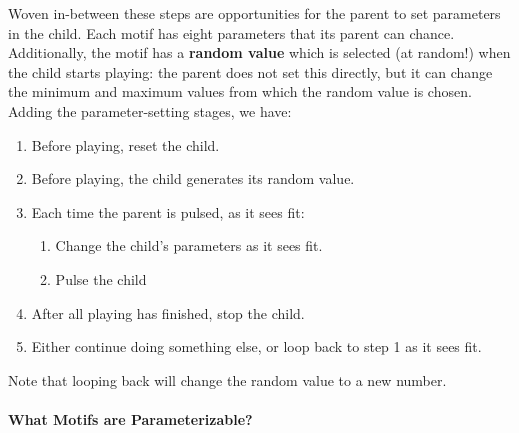 \documentclass[twoside,10pt]{article}
\begin{document}
Woven in-between these steps are opportunities for the parent to set parameters in the child.    Each motif has eight parameters that its parent can chance.  Additionally, the motif has a {\bf random value} which is selected (at random!) when the child starts playing: the parent does not set this directly, but it can change the minimum and maximum values from which the random value is chosen.  Adding the parameter-setting stages, we have: 

\begin{enumerate}
\item Before playing, reset the child.
\item Before playing, the child generates its random value.
\item Each time the parent is pulsed, as it sees fit:
\begin{enumerate}
\item Change the child's parameters as it sees fit.
\item Pulse the child
\end{enumerate}
\item After all playing has finished, stop the child.
\item Either continue doing something else, or loop back to step 1 as it sees fit. 
\end{enumerate}

Note that looping back will change the random value to a new number.

\paragraph{What Motifs are Parameterizable?}
\end{document}
